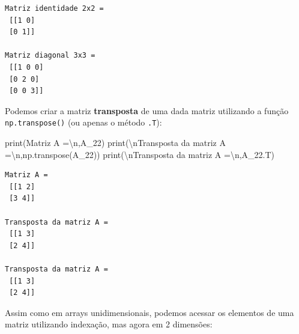 \documentclass[
  brazilian,
  letterpaper,
  DIV=11,
  numbers=noendperiod]{scrreprt}
\newenvironment{Shaded}{\begin{snugshade}}{\end{snugshade}}
\newcommand{\BuiltInTok}[1]{\textcolor[rgb]{0.00,0.23,0.31}{#1}}
\newcommand{\CharTok}[1]{\textcolor[rgb]{0.13,0.47,0.30}{#1}}
\newcommand{\NormalTok}[1]{\textcolor[rgb]{0.00,0.23,0.31}{#1}}
\newcommand{\StringTok}[1]{\textcolor[rgb]{0.13,0.47,0.30}{#1}}
\begin{document}
\begin{verbatim}
Matriz identidade 2x2 =
 [[1 0]
 [0 1]]

Matriz diagonal 3x3 =
 [[1 0 0]
 [0 2 0]
 [0 0 3]]
\end{verbatim}

Podemos criar a matriz \textbf{transposta} de uma dada matriz utilizando
a função \texttt{np.transpose()} (ou apenas o método \texttt{.T}):

\begin{Shaded}
\begin{Highlighting}[]
\BuiltInTok{print}\NormalTok{(}\StringTok{\textquotesingle{}Matriz A =}\CharTok{\textbackslash{}n}\StringTok{\textquotesingle{}}\NormalTok{,A\_22)}
\BuiltInTok{print}\NormalTok{(}\StringTok{\textquotesingle{}}\CharTok{\textbackslash{}n}\StringTok{Transposta da matriz A =}\CharTok{\textbackslash{}n}\StringTok{\textquotesingle{}}\NormalTok{,np.transpose(A\_22))}
\BuiltInTok{print}\NormalTok{(}\StringTok{\textquotesingle{}}\CharTok{\textbackslash{}n}\StringTok{Transposta da matriz A =}\CharTok{\textbackslash{}n}\StringTok{\textquotesingle{}}\NormalTok{,A\_22.T)}
\end{Highlighting}
\end{Shaded}

\begin{verbatim}
Matriz A =
 [[1 2]
 [3 4]]

Transposta da matriz A =
 [[1 3]
 [2 4]]

Transposta da matriz A =
 [[1 3]
 [2 4]]
\end{verbatim}

Assim como em arrays unidimensionais, podemos acessar os elementos de
uma matriz utilizando indexação, mas agora em 2 dimensões:
\end{document}

